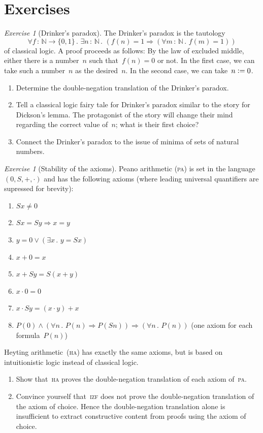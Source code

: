 \documentclass[10pt,reqno,a4paper,openany]{amsbook}
\theoremstyle{definition}
\theoremstyle{plain}
\theoremstyle{remark}
\newcommand{\NN}{\mathbb{N}}
\newcommand{\?}{\,{:}\,}
\renewcommand{\_}{\mathpunct{.}\,}
\newcommand{\defeq}{\vcentcolon=}
\newtheorem{exercise}[defn]{Exercise}
\renewcommand{\theenumi}{\alph{enumi}}
\begin{document}
\section{Exercises}

\begin{exercise}[Drinker's paradox]
The Drinker's paradox is the tautology
\[ \forall f \? \NN \to \{0,1\}\_ \exists n \? \NN\_ (f(n) = 1
\Rightarrow (\forall m \? \NN\_ f(m) = 1)) \]
of classical logic. A proof proceeds as follows: By the law of
excluded middle, either there is a number~$n$ such that~$f(n) = 0$ or not. In
the first case, we can take such a number~$n$ as the desired~$n$. In the second
case, we can take~$n \defeq 0$.
\begin{enumerate}
\item Determine the double-negation translation of the Drinker's paradox.
\item Tell a classical logic fairy tale for Drinker's paradox similar to the
story for Dickson's lemma. The protagonist of the story will change their mind
regarding the correct value of~$n$; what is their first choice?
\item Connect the Drinker's paradox to the issue of minima of sets of natural
numbers.
\end{enumerate}
\end{exercise}

\begin{exercise}[Stability of the axioms]
Peano arithmetic (\textsc{pa}) is set in the language~$(0,S,+,\cdot)$ and has
the following axioms (where leading universal quantifiers are supressed for
brevity):
\begin{enumerate}
\renewcommand{\theenumi}{\arabic{enumi}}
\item $Sx \neq 0$
\item $Sx = Sy \Rightarrow x = y$
\item $y = 0 \vee (\exists x\_ y = Sx)$
\item $x + 0 = x$
\item $x + Sy = S(x+y)$
\item $x \cdot 0 = 0$
\item $x \cdot Sy = (x \cdot y) + x$
\item $P(0) \wedge (\forall n\_ P(n) \Rightarrow P(Sn)) \Longrightarrow
(\forall n\_ P(n))$ (one axiom for each formula~$P(n)$)
\end{enumerate}
Heyting arithmetic~(\textsc{ha}) has exactly the same axioms, but is based on intuitionistic
logic instead of classical logic.
\begin{enumerate}
\item Show that~\textsc{ha} proves the double-negation translation of each
axiom of~\textsc{pa}.
\item Convince yourself that~\textsc{izf} does not prove the double-negation
translation of the axiom of choice. Hence the double-negation translation
alone is insufficient to extract constructive content from proofs using the
axiom of choice.
\end{enumerate}
\end{exercise}
\end{document}
